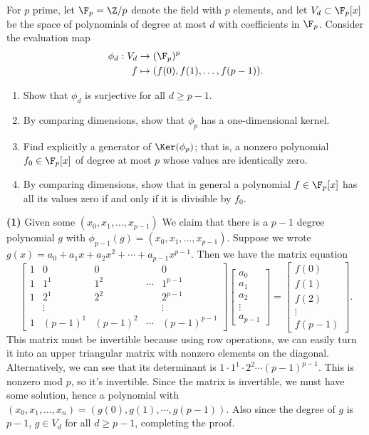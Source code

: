 \begin{problem}
For $p$ prime, let $\F_p=\Z/p$ denote the field with $p$ elements, and let $V_d\subset\F_p[x]$ be the space of polynomials of degree at most $d$ with coefficients in $\F_p$. Consider the evaluation map
\begin{align*} 
\phi_d:V_d&\to (\F_p)^p\\
f&\mapsto (f(0),f(1),\dots,f(p-1)).
\end{align*}
\begin{enumerate}
  \item Show that $\phi_d$ is surjective for all $d\geq p-1$.
  \item By comparing dimensions, show that $\phi_p$ has a one-dimensional
  kernel.
  \item Find explicitly a generator of $\Ker(\phi_p)$; that is, a nonzero
  polynomial $f_0\in \F_p[x]$ of degree at most $p$ whose values are identically zero.
  \item By comparing dimensions, show that in general a polynomial $f\in
  \F_p[x]$ has all its values zero if and only if it is divisible by $f_0$.
\end{enumerate}
\end{problem}


\textbf{(1)} Given some $(x_0,x_1,\ldots, x_{p-1})$ We claim that there is a $p-1$ degree polynomial $g$ with $\phi_{p-1}(g)=(x_0,x_1,\ldots,x_{p-1})$. Suppose we wrote $g(x)=a_0+a_1x+a_2x^2+\cdots+a_{p-1}x^{p-1}$. Then we have the matrix equation
\[
  \begin{bmatrix}
    1&0&0&& 0\\
    1&1^1&1^2&\cdots &1^{p-1}\\
    1&2^1&2^2& &2^{p-1}\\
    &\vdots&& &\vdots\\
    1&(p-1)^1&(p-1)^2&\cdots&(p-1)^{p-1}
  \end{bmatrix}
  \begin{bmatrix}
    a_0\\
    a_1\\
    a_2\\
    \vdots\\
    a_{p-1}
  \end{bmatrix}=
  \begin{bmatrix}
    f(0)\\
    f(1)\\
    f(2)\\
    \vdots\\
    f(p-1)
  \end{bmatrix}
.\]
This matrix must be invertible because using row operations, we can easily turn it into an upper triangular matrix with nonzero elements on the diagonal. Alternatively, we can see that its determinant is $1\cdot 1^1\cdot 2^2\cdots (p-1)^{p-1}$. This is nonzero mod $p$, so it's invertible. Since the matrix is invertible, we must have some solution, hence a polynomial with $(x_0, x_1, \ldots, x_n)=(g(0), g(1), \cdots, g(p-1))$. Also since the degree of $g$ is $p-1$, $g\in V_d$ for all $d\geq p-1$, completing the proof.   

